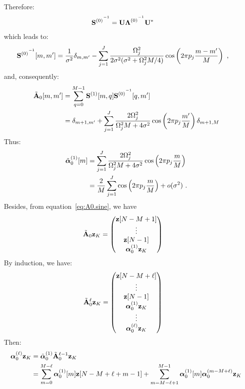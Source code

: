 Therefore:
\begin{align*}
{{\mathbf S}^{(0)}}^{^{-1}}  &= {\mathbf U}{\boldsymbol{\Lambda}^{(0)}}^{^{-1}}{\mathbf U}^*
\end{align*}
which leads to:
\begin{align*}
{{\mathbf S}^{(0)}}^{^{-1}}[m,m']  &= \dfrac1{\sigma^2}\delta_{m,m'}-\sum_{j=1}^J\dfrac{\Omega_j^2}{2\sigma^2(\sigma^2+\Omega_j^2M/4)}\cos\left(2\pi p_j \dfrac{m-m'}{M}\right)\ ,
\end{align*}
and, consequently:
\begin{align}
\nonumber
\tilde{{\mathbf A}}_0[m,m']  &= \sum_{q=0}^{M-1} {{\mathbf S}^{(1)}}[m,q]{{\mathbf S}^{(0)}}^{^{-1}}[q,m'] \\
&= \delta_{m+1,m'} + \sum_{j=1}^J\dfrac{2\Omega_j^2}{\Omega_j^2M+4\sigma^2}\cos\left(2\pi p_j\frac{m'}{M}\right)\delta_{m+1,M}
\label{eq:A0.sine}
\end{align}
Thus:
\begin{align*}
\tilde{\boldsymbol{\alpha}}_0^{(1)}[m]  &=\sum_{j=1}^J\dfrac{2\Omega_j^2}{\Omega_j^2M+4\sigma^2}\cos\left(2\pi p_j\frac{m}{M}\right) \\
&= \dfrac{2}{M}\sum_{j=1}^J\cos\left(2\pi p_j\frac{m}{M}\right) + o(\sigma^2)\ .
\end{align*}
Besides, from equation~\eqref{eq:A0.sine}, we have
\begin{align*}
\tilde{{\mathbf A}}_0{\mathbf z}_{K} &= 
\begin{pmatrix}
{\mathbf z}[N-M+1] \\
\vdots \\
{\mathbf z}[N-1] \\
\boldsymbol{\alpha}_0^{(1)}{\mathbf z}_K
\end{pmatrix}
\end{align*}
By induction, we have:
\begin{align*}
\tilde{{\mathbf A}}_0^{\ell}{\mathbf z}_{K} &= 
\begin{pmatrix}
{\mathbf z}[N-M+\ell] \\
\vdots \\
{\mathbf z}[N-1] \\
\boldsymbol{\alpha}_0^{(1)}{\mathbf z}_K \\
\vdots \\
\boldsymbol{\alpha}_0^{(\ell)}{\mathbf z}_K
\end{pmatrix}
\end{align*}
Then:
\begin{align}
\nonumber
\boldsymbol{\alpha}_0^{(\ell)}{\mathbf z}_{K} &= \tilde{\boldsymbol{\alpha}}_0^{(1)}\tilde{{\mathbf A}}_0^{\ell-1}{\mathbf z}_{K} \\
&=\sum_{m=0}^{M-\ell}\boldsymbol{\alpha}_0^{(1)}[m]{\mathbf z}[N-M+\ell+m-1]+\sum_{m=M-\ell+1}^{M-1}\boldsymbol{\alpha}_0^{(1)}[m]\boldsymbol{\alpha}_0^{(m-M+\ell)}{\mathbf z}_K
\label{eq:seq}
\end{align}

